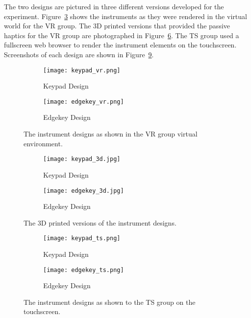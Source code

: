 The two designs are pictured in three different versions developed for the experiment.
Figure~\ref{fig:de_vr_instrument} shows the instruments as they were rendered in the virtual world for the VR group.
The 3D printed versions that provided the passive haptics for the VR group are photographed in Figure~\ref{fig:de_3d_instrument}.
The TS group used a fullscreen web browser to render the instrument elements on the touchscreen.
Screenshots of each design are shown in Figure~\ref{fig:de_ts_instrument}.

\begin{figure}
    \centering
    \begin{subfigure}[t]{0.95\linewidth}
        \centering
        \texttt{[image: keypad\_vr.png]}
        \caption{Keypad Design}
        \label{fig:de_vr_instrument:keypad}
    \end{subfigure}
    \begin{subfigure}[t]{0.95\linewidth}
        \centering
        \texttt{[image: edgekey\_vr.png]}
        \caption{Edgekey Design}
        \label{fig:de_vr_instrument:edgekey}
    \end{subfigure}
    \caption{The instrument designs as shown in the VR group virtual environment.}
    \label{fig:de_vr_instrument}
\end{figure}

\begin{figure}
    \centering
    \begin{subfigure}[t]{0.95\linewidth}
        \centering
        \texttt{[image: keypad\_3d.jpg]}
        \caption{Keypad Design}
        \label{fig:de_3d_instrument:keypad}
    \end{subfigure}
    \begin{subfigure}[t]{0.95\linewidth}
        \centering
        \texttt{[image: edgekey\_3d.jpg]}
        \caption{Edgekey Design}
        \label{fig:de_3d_instrument:edgekey}
    \end{subfigure}
    \caption{The 3D printed versions of the instrument designs.}
    \label{fig:de_3d_instrument}
\end{figure}

\begin{figure}
    \centering
    \begin{subfigure}[t]{0.95\linewidth}
        \centering
        \texttt{[image: keypad\_ts.png]}
        \caption{Keypad Design}
        \label{fig:de_ts_instrument:keypad}
    \end{subfigure}
    \begin{subfigure}[t]{0.95\linewidth}
        \centering
        \texttt{[image: edgekey\_ts.png]}
        \caption{Edgekey Design}
        \label{fig:de_ts_instrument:edgekey}
    \end{subfigure}
    \caption{The instrument designs as shown to the TS group on the touchscreen.}
    \label{fig:de_ts_instrument}
\end{figure}

